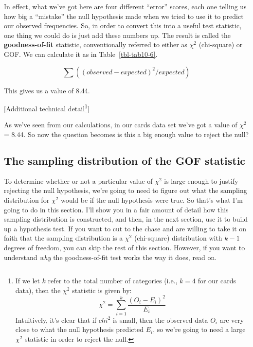 \documentclass[
  a4paper,
]{book}
\begin{document}
In effect, what we've got here are four different ``error'' scores, each
one telling us how big a ``mistake'' the null hypothesis made when we
tried to use it to predict our observed frequencies. So, in order to
convert this into a useful test statistic, one thing we could do is just
add these numbers up. The result is called the \textbf{goodness-of-fit}
statistic, conventionally referred to either as \(\chi^2\) (chi-square)
or GOF. We can calculate it as in Table~\ref{tbl-tab10-6}.

\[\sum( (observed - expected)^2 / expected )\]

This gives us a value of 8.44.

{[}Additional technical detail\footnote{If we let \(k\) refer to the
  total number of categories (i.e., \(k = 4\) for our cards data), then
  the \(\chi^2\) statistic is given by:
  \[\chi^2 = \sum_{i=1}^{k} \frac{(O_i-E_i)^2}{E_i}\] Intuitively, it's
  clear that if \(chi^2\) is small, then the observed data \(O_i\) are
  very close to what the null hypothesis predicted \(E_i\), so we're
  going to need a large \(\chi^2\) statistic in order to reject the
  null.}{]}

As we've seen from our calculations, in our cards data set we've got a
value of \(\chi^2\) = 8.44. So now the question becomes is this a big
enough value to reject the null?

\hypertarget{the-sampling-distribution-of-the-gof-statistic}{%
\subsection{The sampling distribution of the GOF
statistic}\label{the-sampling-distribution-of-the-gof-statistic}}

To determine whether or not a particular value of \(\chi^2\) is large
enough to justify rejecting the null hypothesis, we're going to need to
figure out what the sampling distribution for \(\chi^2\) would be if the
null hypothesis were true. So that's what I'm going to do in this
section. I'll show you in a fair amount of detail how this sampling
distribution is constructed, and then, in the next section, use it to
build up a hypothesis test. If you want to cut to the chase and are
willing to take it on faith that the sampling distribution is a
\(\chi^2\) (chi-square) distribution with \(k - 1\) degrees of freedom,
you can skip the rest of this section. However, if you want to
understand \emph{why} the goodness-of-fit test works the way it does,
read on.
\end{document}
